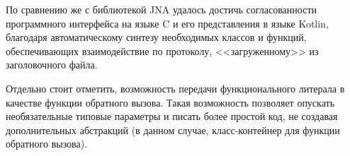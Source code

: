 По сравнению же с библиотекой JNA удалось достичь согласованности программного интерфейса на языке C и его представления в языке Kotlin,
благодаря автоматическому синтезу необходимых классов и функций, обеспечивающих взаимодействие по протоколу, <<загруженному>> из заголовочного файла.

Отдельно стоит отметить, возможность передачи функционального литерала в качестве функции обратного вызова.
Такая возможность позволяет опускать необязательные типовые параметры и писать более простой код, не создавая дополнительных абстракций (в данном случае, класс-контейнер для функции обратного вызова).

